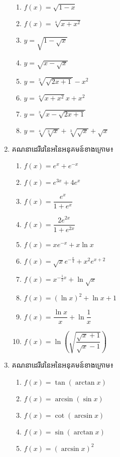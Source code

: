 \documentclass[a4paper,12pt]{article}
\begin{document}
\begin{enumerate}
\begin{multicols}{2}
\begin{enumerate}
			      \item $f(x)= \sqrt{1-x}$
			      \item $f(x)= \sqrt[4]{ x+x^2}$
			      \item $y= \sqrt{1-\sqrt{x}}$
			      \item $y= \sqrt{x-\sqrt{ x}}$
			      \item $y=\sqrt[3]{\sqrt{ 2x+1}}-x^2$
			      \item $y= \sqrt[4]{x+x^2} x+x^2$
			      \item $y=\sqrt[3]{ x- \sqrt{2x+1}}$
			      \item $y= \sqrt[4]{\sqrt[3]{x}}+\sqrt[3]{\sqrt{x}}+\sqrt{x}$
		      \end{enumerate}
	      \end{multicols}
	\item គណនាដេរីវេនៃអនៃអនុគមន៍ខាងក្រោម៖
	      \begin{multicols}{2}
		      \begin{enumerate}
			      \item $f(x)=e^x+e^{-x}$
			      \item $f(x)=e^{3x} +4e^x$
			      \item $f(x)=\dfrac{e^x}{1+e^x}$
			      \item $f(x)=\dfrac{2e^{2x}}{1+e^{2x}}$
			      \item $f(x)=xe^{-x}+x\ln x$
			      \item $f(x)=\sqrt{x}e^{-\frac{x}{4}}+x^2e^{x+2}$
			      \item $f(x)=x^{-\frac{1}{2}x}+\ln \sqrt{x}$
			      \item $f(x)=(\ln x)^2+\ln x+1$
			      \item $f(x)=\dfrac{\ln x}{x}+\ln \dfrac{1}{x}$
			      \item $f(x)=\ln \left( \sqrt{\dfrac{\sqrt{x}+1}{\sqrt{x}-1}}\right)$
		      \end{enumerate}
	      \end{multicols}
	\item គណនាដេរីវេនៃអនៃអនុគមន៍ខាងក្រោម៖
	      \begin{multicols}{2}
		      \begin{enumerate}
			      \item $f(x)=\tan (\arctan x)$
			      \item $f(x)=\arcsin (\sin x)$
			      \item $f(x)=\cot (\arcsin x)$
			      \item $f(x)=\sin (\arctan x)$
			      \item $f(x)=(\arcsin x)^2$

\end{enumerate}
\end{multicols}
\end{enumerate}
\end{document}
